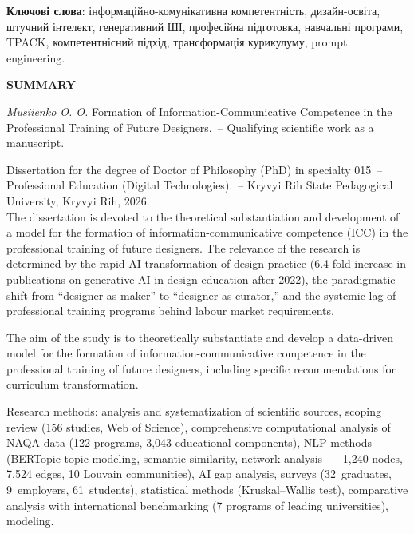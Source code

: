 \textbf{Ключові слова}: інформаційно-комунікативна компетентність, дизайн-освіта, штучний інтелект, генеративний ШІ, професійна підготовка, навчальні програми, TPACK, компетентнісний підхід, трансформація курикулуму, prompt engineering.

\begin{center}
{\large \textbf{SUMMARY}}
\end{center}

\textit{Musiienko O. O.} Formation of Information-Communicative Competence in the Professional Training of Future Designers.~-- Qualifying scientific work as a manuscript.

Dissertation for the degree of Doctor of Philosophy (PhD) in specialty 015~-- Professional Education (Digital Technologies).~-- Kryvyi Rih State Pedagogical University, Kryvyi Rih, 2026.\\

The dissertation is devoted to the theoretical substantiation and development of a model for the formation of information-communicative competence (ICC) in the professional training of future designers. The relevance of the research is determined by the rapid AI transformation of design practice (6.4-fold increase in publications on generative AI in design education after 2022), the paradigmatic shift from ``designer-as-maker'' to ``designer-as-curator,'' and the systemic lag of professional training programs behind labour market requirements.

The aim of the study is to theoretically substantiate and develop a data-driven model for the formation of information-communicative competence in the professional training of future designers, including specific recommendations for curriculum transformation.

Research methods: analysis and systematization of scientific sources, scoping review (156 studies, Web of Science), comprehensive computational analysis of NAQA data (122 programs, 3,043 educational components), NLP methods (BERTopic topic modeling, semantic similarity, network analysis~--- 1,240 nodes, 7,524 edges, 10 Louvain communities), AI gap analysis, surveys (32~graduates, 9~employers, 61~students), statistical methods (Kruskal--Wallis test), comparative analysis with international benchmarking (7 programs of leading universities), modeling.

